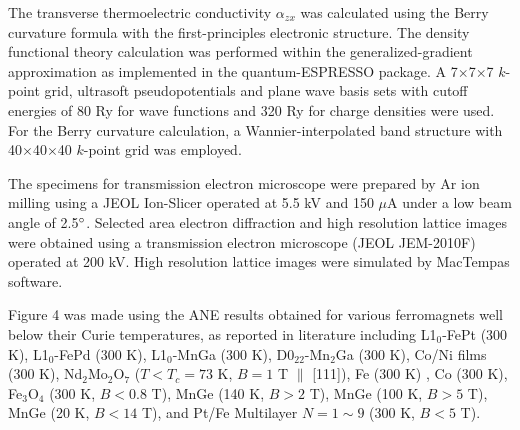 \documentclass[amsmath,amssymb]{nature}
\begin{document}
The transverse thermoelectric conductivity $\alpha_{zx}$ was calculated using the Berry curvature formula\cite{Xiao2006} with the first-principles electronic structure. The density functional theory calculation was performed within the generalized-gradient approximation\cite{Perdew1996} as implemented in the quantum-ESPRESSO package\cite{giannozzi2009}. A 7$\times$7$\times$7 $k$-point grid, ultrasoft pseudopotentials\cite{vanderbilt1990} and plane wave basis sets with cutoff energies of 80 Ry for wave functions and 320 Ry for charge densities were used. For the Berry curvature calculation, a Wannier-interpolated band structure\cite{mostofi2008} with 40$\times$40$\times$40 $k$-point grid was employed.

The specimens for transmission electron microscope were prepared by Ar ion milling using
a JEOL Ion-Slicer operated at 5.5 kV and 150 $\mu$A under a low beam angle of 2.5$\degree$. Selected area
electron diffraction and high resolution lattice images were obtained using a transmission electron
microscope (JEOL JEM-2010F) operated at 200 kV. High resolution lattice images were simulated
by MacTempas software. 

Figure 4 was made using the ANE results obtained for various ferromagnets well below their Curie temperatures, as reported in literature including   L1$_0$-FePt  (300 K)\cite{Hasegawa2015}, L1$_0$-FePd  (300 K)\cite{Hasegawa2015}, L1$_0$-MnGa  (300 K)\cite{Hasegawa2015}, D0$_{22}$-Mn$_2$Ga  (300 K)\cite{Hasegawa2015}, Co/Ni films  (300 K)\cite{Hasegawa2015}, Nd$_2$Mo$_2$O$_7$  ($T<T_{c}= 73$ K, $B= 1$ T $\parallel$ [111])\cite{hanasaki2008}, Fe (300 K) \cite{weischenberg2013}, Co (300 K)\cite{weischenberg2013},  Fe$_3$O$_4$ (300 K, $B< 0.8$ T)\cite{ramos2014}, MnGe  (140 K, $B> 2$ T)\cite{Shiomi2013}, MnGe  (100 K, $B>5$ T)\cite{Shiomi2013}, MnGe  (20 K, $B<14$ T)\cite{Shiomi2013}, and  Pt/Fe Multilayer $N=1\sim9$ (300 K, $B<5$ T)\cite{Uchida2015}.
\newpage




\end{document}
